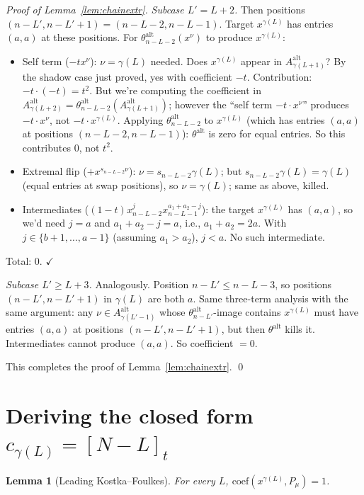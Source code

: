 \documentclass[11pt]{article}
\newtheorem{lemma}[theorem]{Lemma}
\newcommand{\Aalt}{A^{\mathrm{alt}}}
\newcommand{\thalt}{\theta^{\mathrm{alt}}}
\newcommand{\gauss}[1]{[#1]_t}
\begin{document}
\begin{proof}[Proof of Lemma~\ref{lem:chainextr}]
\emph{Subcase $L' = L + 2$.}  Then positions $(n-L', n-L'+1) = (n-L-2, n-L-1)$.
Target $x^{\gamma(L)}$ has entries $(a, a)$ at these positions.
For $\thalt_{n-L-2}(x^\nu)$ to produce $x^{\gamma(L)}$:
\begin{itemize}
\item Self term ($-t x^\nu$): $\nu = \gamma(L)$ needed.  Does $x^{\gamma(L)}$
appear in $\Aalt_{\gamma(L+1)}$?  By the shadow case just proved, yes with
coefficient $-t$.  Contribution: $-t \cdot (-t) = t^2$.  But we're computing
the coefficient in $\Aalt_{\gamma(L+2)} = \thalt_{n-L-2}(\Aalt_{\gamma(L+1)})$;
however the ``self term $-t \cdot x^\nu$'' produces $-t \cdot x^\nu$, not
$-t \cdot x^{\gamma(L)}$.  Applying $\thalt_{n-L-2}$ to $x^{\gamma(L)}$ (which
has entries $(a, a)$ at positions $(n-L-2, n-L-1)$): $\thalt$ is zero for
equal entries.  So this contributes $0$, not $t^2$.
\item Extremal flip ($+x^{s_{n-L-2} \nu}$): $\nu = s_{n-L-2} \gamma(L)$; but
$s_{n-L-2} \gamma(L) = \gamma(L)$ (equal entries at swap positions), so
$\nu = \gamma(L)$; same as above, killed.
\item Intermediates ($(1-t) x_{n-L-2}^j x_{n-L-1}^{a_1 + a_2 - j}$): the
target $x^{\gamma(L)}$ has $(a, a)$, so we'd need $j = a$ and $a_1 + a_2 - j = a$,
i.e., $a_1 + a_2 = 2a$.  With $j \in \{b+1, \ldots, a-1\}$ (assuming
$a_1 > a_2$), $j < a$.  No such intermediate.
\end{itemize}
Total: $0$. $\checkmark$

\emph{Subcase $L' \ge L + 3$.}  Analogously.  Position $n - L' \le n - L - 3$,
so positions $(n - L', n - L' + 1)$ in $\gamma(L)$ are both $a$.  Same
three-term analysis with the same argument: any $\nu \in \Aalt_{\gamma(L' - 1)}$
whose $\thalt_{n-L'}$-image contains $x^{\gamma(L)}$ must have entries $(a, a)$
at positions $(n-L', n-L'+1)$, but then $\thalt$ kills it.  Intermediates
cannot produce $(a, a)$.  So coefficient $=0$.

This completes the proof of Lemma~\ref{lem:chainextr}. \qed
\end{proof}

\section{Deriving the closed form $c_{\gamma(L)} = \gauss{N-L}$}

\begin{lemma}[Leading Kostka--Foulkes]\label{lem:leadKF}
For every $L$, $\mathrm{coef}(x^{\gamma(L)}, P_\mu) = 1$.
\end{lemma}
\end{document}
